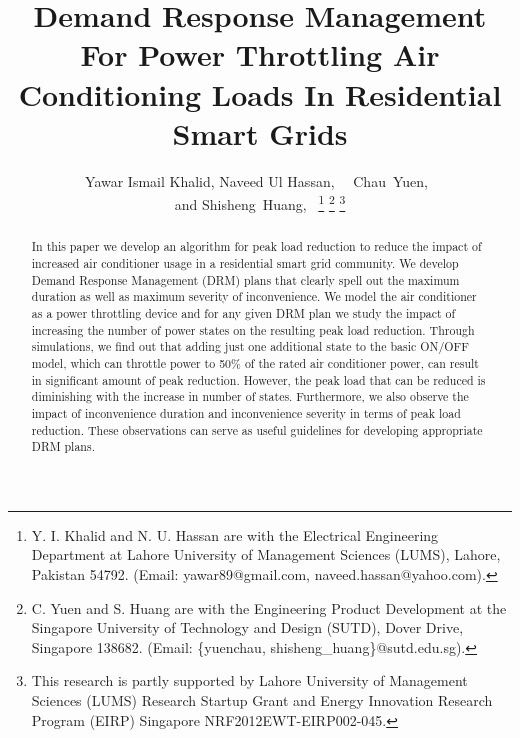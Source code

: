 \documentclass[10pt,twocolumn,twoside]{IEEEtran}
\begin{document}
\title{Demand Response Management For Power Throttling Air Conditioning Loads In Residential Smart Grids}


\author{Yawar Ismail Khalid, Naveed Ul Hassan,~  ~Chau~Yuen,~ \\ and Shisheng~Huang,~
\thanks{Y. I. Khalid and N. U. Hassan are with the Electrical Engineering Department at Lahore University of Management Sciences (LUMS), Lahore, Pakistan 54792. (Email: yawar89@gmail.com, naveed.hassan@yahoo.com).}
\thanks{C. Yuen and S. Huang are with the Engineering Product Development at the Singapore University of Technology and Design (SUTD), Dover Drive, Singapore 138682. (Email: \{yuenchau, shisheng\_huang\}@sutd.edu.sg).}
\thanks{This research is partly supported by Lahore University of Management Sciences (LUMS) Research Startup Grant and Energy Innovation Research Program (EIRP) Singapore NRF2012EWT-EIRP002-045.}
}
\IEEEoverridecommandlockouts
\maketitle


\begin{abstract}
In this paper we develop an algorithm for peak load reduction to reduce the impact of increased air conditioner usage in a residential smart grid community. We develop Demand Response Management (DRM) plans that clearly spell out the maximum duration as well as maximum severity of inconvenience. We model the air conditioner as a power throttling device and for any given DRM plan we study the impact of increasing the number of power states on the resulting peak load reduction. Through simulations, we find out that adding just one additional state to the basic ON/OFF model, which can throttle power to 50\% of the rated air conditioner power, can result in significant amount of peak reduction. However, the peak load that can be reduced is diminishing with the increase in number of states. Furthermore, we also observe the impact of inconvenience duration and inconvenience severity in terms of peak load reduction. These observations can serve as useful guidelines for developing appropriate DRM plans.

\end{abstract}
\end{document}
